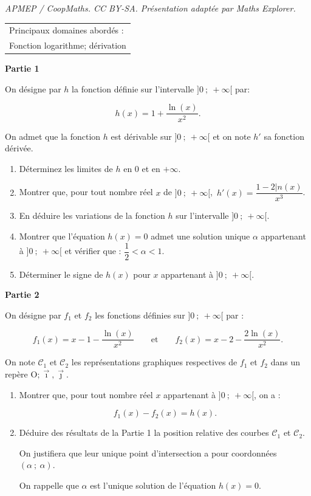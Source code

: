 \documentclass[10pt]{article}
\providecommand{\Oij}{\(\mathrm{O};\vec{\imath},\vec{\jmath}\)}
\begin{document}
\noindent\textit{APMEP / CoopMaths. CC BY-SA. Présentation adaptée par Maths Explorer.}\par\medskip
\smallskip

\begin{tabular}{|l|}\hline
Principaux domaines abordés :\\
Fonction logarithme; dérivation\\ \hline
\end{tabular}

\begin{center}\textbf{Partie 1}\end{center}

On désigne par $h$ la fonction définie sur l'intervalle $]0~;~ +\infty[$ par:

\[h(x) = 1 + \dfrac{\ln (x)}{x^2}.\]

On admet que la fonction $h$ est dérivable sur $]0~;~ +\infty[$ et on note $h'$ sa fonction dérivée.

\medskip

\begin{enumerate}
\item Déterminez les limites de $h$ en $0$ et en $+ \infty$.
\item Montrer que, pour tout nombre réel $x$ de $]0~;~ +\infty[$,\, $h'(x) = \dfrac{1 - 2|n (x)}{x^3}$.
\item En déduire les variations de la fonction $h$ sur l'intervalle $]0~;~ +\infty[$.
\item Montrer que l'équation $h(x) = 0$ admet une solution unique $\alpha$ appartenant à $]0~;~ +\infty[$ et vérifier que : $\dfrac{1}{2} < \alpha < 1$.
\item Déterminer le signe de $h(x)$ pour $x$ appartenant à $]0~;~ +\infty[$.
\end{enumerate}

\bigskip

\begin{center}\textbf{Partie 2}\end{center}

On désigne par $f_1$ et $f_2$ les fonctions définies sur $]0~;~ +\infty[$ par :

\[f_1(x) = x-1 - \dfrac{\ln (x)}{x^2}\qquad \text{et}\qquad f_2(x) = x - 2 - \dfrac{2\ln (x)}{x^2}.\]

On note $\mathcal{C}_1$ et $\mathcal{C}_2$ les représentations graphiques respectives de $f_1$ et $f_2$ dans un repère \Oij.

\medskip

\begin{enumerate}
\item Montrer que, pour tout nombre réel $x$ appartenant à $]0~;~ +\infty[$, on a : 

\[f_1(x) - f_2(x) = h(x).\]

\item Déduire des résultats de la Partie 1 la position relative des courbes $\mathcal{C}_1$ et $\mathcal{C}_2$.

On justifiera que leur unique point d'intersection a pour coordonnées $(\alpha~;~\alpha)$.

On rappelle que $\alpha$ est l'unique solution de l'équation $h(x) = 0$.
\end{enumerate}

\bigskip
\end{document}
